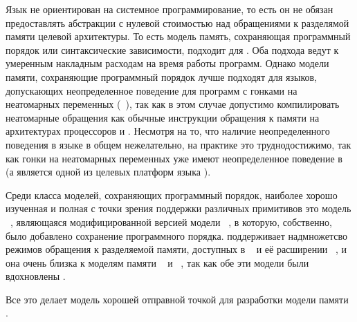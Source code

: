 Язык не ориентирован на системное программирование, 
то есть он не обязан предоставлять абстракции с нулевой стоимостью
над обращениями к разделямой памяти целевой архитектуры. 
То есть модель память, сохраняющая программный порядок 
или синтаксические зависимости, подходит для \Kotlin. 
Оба подхода ведут к умеренным накладным расходам 
на время работы программ. 
Однако модели памяти, сохраняющие программный порядок
лучше подходят для языков, допускающих неопределенное поведение
для программ с гонками на неатомарных переменных
(\see~\cite{Ou-Demsky:OOPSLA18}), 
так как в этом случае допустимо компилировать неатомарные обращения
как обычные инструкции обращения к памяти на архитектурах 
процессоров \ARM и \POWER.
Несмотря на то, что наличие неопределенного поведения в языке 
\Kotlin в общем нежелательно, на практике это труднодостижимо, 
так как гонки на неатомарных переменных уже имеют 
неопределенное поведение в \LLVM~\cite{Chakraborty-Vafeiadis:CGO17}
(а \LLVM является одной из целевых платформ языка \Kotlin).

Среди класса моделей, сохраняющих программный порядок, наиболее 
хорошо изученная и полная с точки зрения поддержки 
различных примитивов это модель \RCMM~\cite{Lahav-al:PLDI17}, 
являющаяся модифицированной версией модели \CMM~\cite{Batty-al:POPL11}, 
в которую, собственно, было добавлено сохранение программного порядка.
\RCMM поддерживает надмножетсво режимов обращения к разделяемой памяти, 
доступных в \JMM~\cite{Manson-al:POPL05} и её расширении \JAM~\cite{Bender-Palsberg:OOPSLA19}, 
и она очень близка к моделям памяти 
\JS~\cite{Watt-al:PLDI2020} и \LLVM~\cite{Chakraborty-Vafeiadis:CGO17}, 
так как обе эти модели были вдохновлены \CMM.

Все это делает модель \RCMM хорошей отправной точкой для разработки модели памяти \Kotlin.


